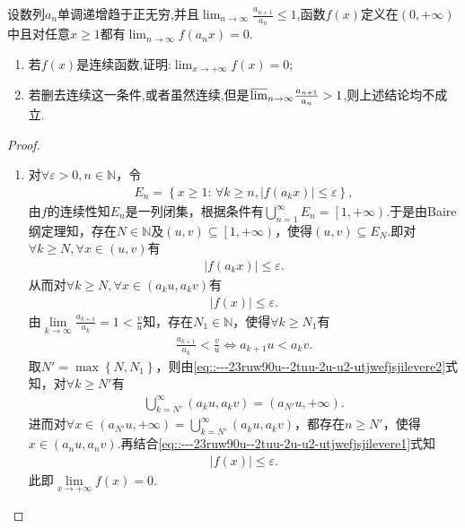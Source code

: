 \documentclass[../../main.tex]{subfiles}%
\begin{document}
\begin{example}
设数列\(a_n\)单调递增趋于正无穷,并且\(\lim_{n \to \infty} \frac{a_{n + 1}}{a_n} \leqslant 1\),函数\(f(x)\)定义在\((0,+\infty)\)中且对任意\(x\geqslant 1\)都有\(\lim_{n \to \infty} f(a_nx) = 0\).
\begin{enumerate}
\item  若\(f(x)\)是连续函数,证明:\(\lim_{x \to +\infty} f(x) = 0\);
\item 若删去连续这一条件,或者虽然连续,但是\({\varlimsup_{n \to \infty}} \frac{a_{n + 1}}{a_n} > 1\),则上述结论均不成立.
\end{enumerate}
\end{example}
\begin{proof}
\begin{enumerate}
\item 对$\forall \varepsilon >0,n\in \mathbb{N}$，令
\begin{align*}
E_n=\left\{ x\geqslant 1:\,\forall k\geqslant n,\left| f\left( a_kx \right) \right|\leqslant \varepsilon \right\},
\end{align*}
由$f$的连续性知$E_n$是一列闭集，根据条件有$\bigcup\limits_{n=1}^{\infty}{E_n}=\left[ 1,+\infty \right).$于是由Baire纲定理知，存在$N\in \mathbb{N}$及$\left( u,v \right) \subseteq \left[ 1,+\infty \right)$，使得$\left( u,v \right) \subseteq E_N.$即对$\forall k\geqslant N,\forall x\in \left( u,v \right)$有
\begin{align*}
\left| f\left( a_kx \right) \right|\leqslant \varepsilon.
\end{align*}
从而对$\forall k\geqslant N,\forall x\in \left( a_ku,a_kv \right)$有
\begin{align}
\left| f\left( x \right) \right|\leqslant \varepsilon. \label{eq::---23ruw90u--2tuu-2u-u2-utjwefjsjilevere1}
\end{align}
由$\lim\limits_{k\rightarrow \infty}\frac{a_{k+1}}{a_k}=1<\frac{v}{u}$知，存在$N_1\in \mathbb{N}$，使得$\forall k\geqslant N_1$有
\begin{align}
\frac{a_{k+1}}{a_k}<\frac{v}{u}\Longleftrightarrow a_{k+1}u<a_kv. \label{eq::---23ruw90u--2tuu-2u-u2-utjwefjsjilevere2}
\end{align}
取$N' =\max \left\{ N,N_1 \right\}$，则由\eqref{eq::---23ruw90u--2tuu-2u-u2-utjwefjsjilevere2}式知，对$\forall k\geqslant N'$有
\begin{align*}
\bigcup\limits_{k=N'}^{\infty}{\left( a_ku,a_kv \right)}=\left( a_{N'}u,+\infty \right).
\end{align*}
进而对$\forall x\in \left( a_{N'}u,+\infty \right) =\bigcup\limits_{k=N'}^{\infty}{\left( a_ku,a_kv \right)}$，都存在$n\geqslant N'$，使得$x\in \left( a_nu,a_nv \right).$再结合\eqref{eq::---23ruw90u--2tuu-2u-u2-utjwefjsjilevere1}式知
\begin{align*}
\left| f\left( x \right) \right|\leqslant \varepsilon.
\end{align*}
此即$\lim\limits_{x\rightarrow +\infty}f\left( x \right) =0.$


\end{enumerate}
\end{proof}
\end{document}
